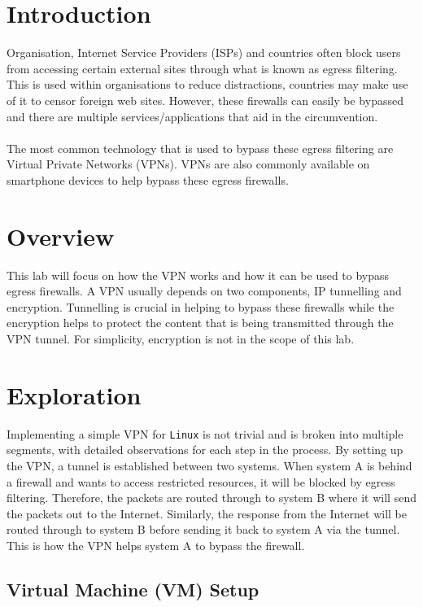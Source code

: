 \documentclass[a4paper,12pt]{article}
\begin{document}
	\newpage
	\setcounter{section}{0}
	\section{Introduction}
	Organisation, Internet Service Providers (ISPs) and countries often block users from accessing certain external sites through what is known as egress filtering. This is used within organisations to reduce distractions, countries may make use of it to censor foreign web sites. However, these firewalls can easily be bypassed and there are multiple services/applications that aid in the circumvention.\\\\The most common technology that is used to bypass these egress filtering are Virtual Private Networks (VPNs). VPNs are also commonly available on smartphone devices to help bypass these egress firewalls.
	\section{Overview}
	This lab will focus on how the VPN works and how it can be used to bypass egress firewalls. A VPN usually depends on two components, IP tunnelling and encryption. Tunnelling is crucial in helping to bypass these firewalls while the encryption helps to protect the content that is being transmitted through the VPN tunnel. For simplicity, encryption is not in the scope of this lab.
	\section{Exploration}
	Implementing a simple VPN for \texttt{Linux} is not trivial and is broken into multiple segments, with detailed observations for each step in the process. By setting up the VPN, a tunnel is established between two systems. When system A is behind a firewall and wants to access restricted resources, it will be blocked by egress filtering. Therefore, the packets are routed through to system B where it will send the packets out to the Internet. Similarly, the response from the Internet will be routed through to system B before sending it back to system A via the tunnel. This is how the VPN helps system A to bypass the firewall.
	\subsection{Virtual Machine (VM) Setup}
\end{document}
